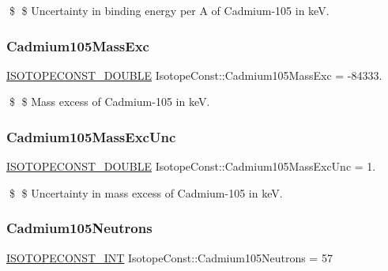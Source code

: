 \$ \$ Uncertainty in binding energy per A of Cadmium-\/105 in keV. \mbox{\label{group___isotope_const-_cadmium-_cd105_ga62ea1a18afe573de1e575154fa9ca674}} 
\subsubsection{\texorpdfstring{Cadmium105\+Mass\+Exc}{Cadmium105MassExc}}
{\footnotesize\ttfamily \mbox{\hyperlink{group___isotope_const-_macros_ga8f45a7272ce02c0b4c65c44636ed719a}{I\+S\+O\+T\+O\+P\+E\+C\+O\+N\+S\+T\+\_\+\+D\+O\+U\+B\+LE}} Isotope\+Const\+::\+Cadmium105\+Mass\+Exc = -\/84333.}

\$ \$ Mass excess of Cadmium-\/105 in keV. \mbox{\label{group___isotope_const-_cadmium-_cd105_gadd0b17691b6ca91836f5d8ab682e27ef}} 
\subsubsection{\texorpdfstring{Cadmium105\+Mass\+Exc\+Unc}{Cadmium105MassExcUnc}}
{\footnotesize\ttfamily \mbox{\hyperlink{group___isotope_const-_macros_ga8f45a7272ce02c0b4c65c44636ed719a}{I\+S\+O\+T\+O\+P\+E\+C\+O\+N\+S\+T\+\_\+\+D\+O\+U\+B\+LE}} Isotope\+Const\+::\+Cadmium105\+Mass\+Exc\+Unc = 1.}

\$ \$ Uncertainty in mass excess of Cadmium-\/105 in keV. \mbox{\label{group___isotope_const-_cadmium-_cd105_ga4914202b61610b6d650f75f56ce5db26}} 
\subsubsection{\texorpdfstring{Cadmium105\+Neutrons}{Cadmium105Neutrons}}
{\footnotesize\ttfamily \mbox{\hyperlink{group___isotope_const-_macros_ga5f18360b3e99483a35c32d789e62621c}{I\+S\+O\+T\+O\+P\+E\+C\+O\+N\+S\+T\+\_\+\+I\+NT}} Isotope\+Const\+::\+Cadmium105\+Neutrons = 57}

